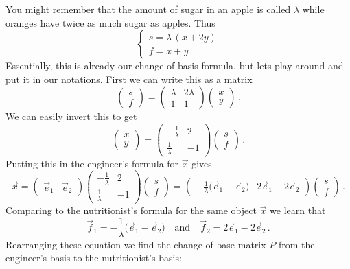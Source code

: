 {You might remember that the amount of sugar in an apple 
is called $\lambda$ while oranges have twice as much sugar as apples.
Thus
$$
\left\{
\begin{array}{l}
s=\lambda\, (x+2y)\\
f=x+y\, .
\end{array}
\right.
$$
Essentially, this is already our change of basis formula, but lets play around and put it in our notations.
First we can write this as a matrix
$$
\begin{pmatrix}s\\f\end{pmatrix}=
\begin{pmatrix}\lambda & 2\lambda \\1 & 1
\end{pmatrix}
\begin{pmatrix}x\\y\end{pmatrix}\, .
$$
We can easily invert this to get
$$
\begin{pmatrix}x\\y\end{pmatrix}
=
\begin{pmatrix}-\frac1\lambda & 2\\ \frac1\lambda & -1
\end{pmatrix}
\begin{pmatrix}s\\f\end{pmatrix}\, .
$$
Putting this in the engineer's formula for $\vec x$ gives
$$
\vec x = 
\begin{pmatrix}\vec e_1 & \vec e_2\end{pmatrix}
\begin{pmatrix}-\frac1\lambda & 2\\ \frac1\lambda & -1
\end{pmatrix}
\begin{pmatrix}s\\f\end{pmatrix}
=
\begin{pmatrix}-\frac1\lambda\big(\vec e_1 - \vec e_2\big) &
2\vec e_1-2\vec e_2\end{pmatrix}
\begin{pmatrix}s\\f\end{pmatrix}\, .
$$
Comparing to the nutritionist's formula for the same object $\vec x$ we learn that
$$
\vec f_1 = -\frac1\lambda\big(\vec e_1 - \vec e_2\big)\quad \mbox{and}\quad
\vec f_2=2\vec e_1-2\vec e_2\, .
$$
Rearranging these equation we find the change of base matrix $P$ from the engineer's basis to the nutritionist's basis:
}
